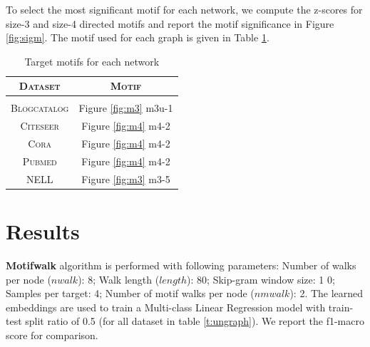 \documentclass{article}
\theoremstyle{definition}
\begin{document}
\begin{table}
\centering
{}
\setlength{\belowcaptionskip}{-10pt}
\caption{Datasets for semi-supervised embeddings}
\label{t:segraph}
\end{table}
To select the most significant motif for each network, we compute the z-scores for
size-3 and size-4 directed motifs and report the motif significance
in Figure \ref{fig:sigm}. The motif used for each graph is given in Table
\ref{t:motifs}. 
\begin{table}
\centering
\begin{tabular}{c c}
\textsc{Dataset} & \textsc{Motif} \\
\hline \\
\textsc{Blogcatalog} & Figure \ref{fig:m3} m3u-1 \\
\textsc{Citeseer} & Figure \ref{fig:m4} m4-2 \\
\textsc{Cora} & Figure \ref{fig:m4} m4-2 \\
\textsc{Pubmed} & Figure \ref{fig:m4} m4-2 \\
\textsc{NELL} & Figure \ref{fig:m3} m3-5 \\
\end{tabular}%
\caption{Target motifs for each network}
\label{t:motifs}
\end{table}
\section{Results}
\textbf{Motifwalk} algorithm is performed with following parameters: Number of
walks per node ($nwalk$): 8; Walk length ($length$): 80; Skip-gram window size: 1
0; Samples per target: 4;  Number of motif walks per node ($nmwalk$): 2. The
learned embeddings are used to train a Multi-class Linear Regression model with
train-test split ratio of 0.5 (for all dataset in table \ref{t:ungraph}). We report
the f1-macro score for comparison.
\end{document}
